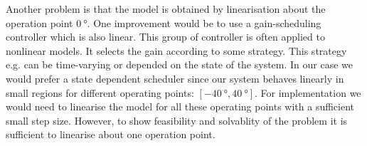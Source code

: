 Another problem is that the model is obtained by linearisation about the operation point $\SI{0}{\degree}$. One improvement would be to use a gain-scheduling controller which is also linear. This group of controller is often applied to nonlinear models. It selects the gain according to some strategy. This strategy e.g. can be time-varying or depended on the state of the system. In our case we would prefer a state dependent scheduler since our system behaves linearly in small regions for different operating points: $[-\SI{40}{\degree},\SI{40}{\degree}]$. For implementation we would need to linearise the model for all these operating points with a sufficient small step size. However, to show feasibility and solvablity of the problem it is sufficient to linearise about one operation point. 
